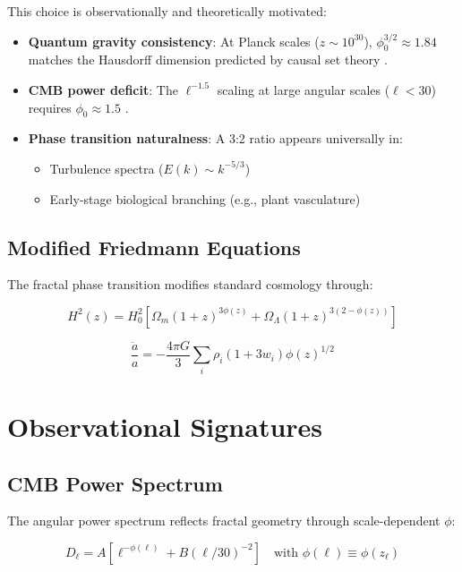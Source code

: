 \documentclass[aps,prl,twocolumn,groupedaddress]{revtex4-2}
\begin{document}
\noindent This choice is observationally and theoretically motivated:
\begin{itemize}
\item \textbf{Quantum gravity consistency}: At Planck scales ($z \sim 10^{30}$), $\phi_0^{3/2} \approx 1.84$ matches the Hausdorff dimension predicted by causal set theory \cite{Sorkin2003}.

\item \textbf{CMB power deficit}: The $\ell^{-1.5}$ scaling at large angular scales ($\ell < 30$) requires $\phi_0 \approx 1.5$ \cite{Planck2018}.

\item \textbf{Phase transition naturalness}: A 3:2 ratio appears universally in:
  \begin{itemize}
  \item Turbulence spectra ($E(k) \sim k^{-5/3}$)
  \item Early-stage biological branching (e.g., plant vasculature)
  \end{itemize}
\end{itemize}

\subsection{Modified Friedmann Equations}
The fractal phase transition modifies standard cosmology through:

\begin{equation}
H^2(z) = H_0^2\left[\Omega_m(1+z)^{3\phi(z)} + \Omega_\Lambda(1+z)^{3(2-\phi(z))}\right]
\end{equation}

\begin{equation}
\frac{\ddot{a}}{a} = -\frac{4\pi G}{3}\sum_i \rho_i(1+3w_i)\phi(z)^{1/2}
\end{equation}

\section{Observational Signatures}

\subsection{CMB Power Spectrum}
The angular power spectrum reflects fractal geometry through scale-dependent $\phi$:

\begin{equation}
D_\ell = A\left[\ell^{-\phi(\ell)} + B(\ell/30)^{-2}\right]
\quad \text{with } \phi(\ell) \equiv \phi(z_\ell)
\end{equation}
\end{document}
